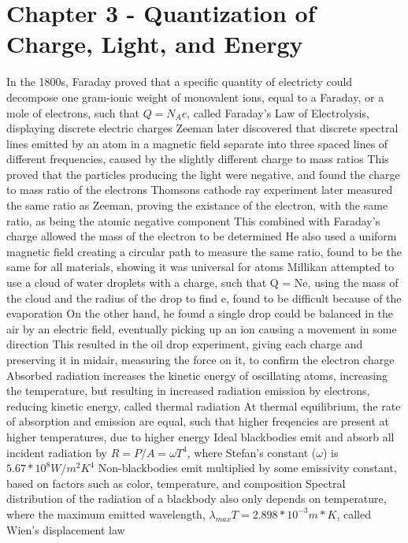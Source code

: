 \documentclass[11 pt, twoside]{article}
\newenvironment{outline*}
{
	\begin{outline}[enumerate]
	}
	{\end{outline}
}
\begin{document}
\section{Chapter 3 - Quantization of Charge, Light, and Energy}
\begin{outline*}
\1 In the 1800s, Faraday proved that a specific quantity of electricty could decompose one gram-ionic weight of monovalent ions, equal to a Faraday, or a mole of electrons, such that $Q = N_Ae$, called Faraday's Law of Electrolysis, displaying discrete electric charges
	\2 Zeeman later discovered that discrete spectral lines emitted by an atom in a magnetic field separate into three spaced lines of different frequencies, caused by the slightly different charge to mass ratios
		\3 This proved that the particles producing the light were negative, and found the charge to mass ratio of the electrons
	\2 Thomsons cathode ray experiment later measured the same ratio as Zeeman, proving the existance of the electron, with the same ratio, as being the atomic negative component
		\3 This combined with Faraday's charge allowed the mass of the electron to be determined
		\3 He also used a uniform magnetic field creating a circular path to measure the same ratio, found to be the same for all materials, showing it was universal for atoms
	\2 Millikan attempted to use a cloud of water droplets with a charge, such that Q = Ne, using the mass of the cloud and the radius of the drop to find e, found to be difficult because of the evaporation
		\3 On the other hand, he found a single drop could be balanced in the air by an electric field, eventually picking up an ion causing a movement in some direction
		\3 This resulted in the oil drop experiment, giving each charge and preserving it in midair, measuring the force on it, to confirm the electron charge
\1 Absorbed radiation increases the kinetic energy of oscillating atoms, increasing the temperature, but resulting in increased radiation emission by electrons, reducing kinetic energy, called thermal radiation
	\2 At thermal equilibrium, the rate of absorption and emission are equal, such that higher freqencies are present at higher temperatures, due to higher energy
	\2 Ideal blackbodies emit and absorb all incident radiation by $R = P/A = \omega T^4$, where Stefan's constant ($\omega$) is $5.67 * 10^8 W/m^2K^4$
		\3 Non-blackbodies emit multiplied by some emissivity constant, based on factors such as color, temperature, and composition
	\2 Spectral distribution of the radiation of a blackbody also only depends on temperature, where the maximum emitted wavelength, $\lambda_{max} T = 2.898 * 10^{-3} m*K$, called Wien's displacement law

\end{outline*}
\end{document}
